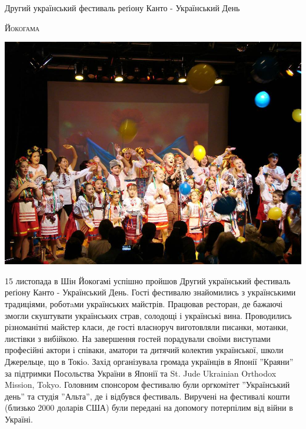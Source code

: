 \documentclass[10pt,a4paper]{article}
\newcommand{\NewsItem}[1]{%
		\usefont{T2A}{iwona}{m}{n} 
		\large #1 \vspace{4pt}
		\par \normalsize \normalfont}
\newcommand{\NewsAuthor}[1]{%
			\hfill \textsc{#1} \vspace{4pt}
			\par \normalfont}
\begin{document}
\begin{multicols}{3}
\vspace{1cm}

\NewsItem{Другий український фестиваль реґіону Канто - Український День}
\NewsAuthor{Йокогама}
\begin{center}
\includegraphics[width=0.8\linewidth]{images/5}
\end{center}
15 листопада в Шін Йокогамі успішно пройшов Другий український фестиваль реґіону Канто - Український День. Гості фестивалю знайомились з українськими традиціями, роботaми українських майстрів. Працював ресторан, де бажаючі змогли скуштувати українських страв, солодощі і українські вина. Проводились різноманітні майстер класи, де гості власноруч виготовляли писанки, мотанки, листівки з вибійкою. На завершення гостей порадували своїми виступами професійні актори і співаки, аматори та дитячий колектив української, школи Джерельце, що в Токіo. Захід організувала громада українців в Японії ''Краяни'' за підтримки Посольства України в Японії та St. Jude Ukrainian Orthodox Mission, Tokyo. Головним спонсором фестивалю були оргкомітет ''Український день'' та студія ''Альта'', де і відбувся фестиваль. Виручені на фестивалі кошти (близько 2000 доларів США) були передані на допомогу потерпілим від війни в Україні.

\end{multicols}

\newpage
\end{document}
